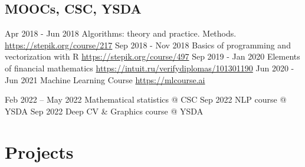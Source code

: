\documentclass[11pt,a4paper]{moderncv}
\begin{document}
\subsection{MOOCs, CSC, YSDA}
\cventry
{Apr 2018 - Jun 2018}
{Algorithms: theory and practice. Methods.}
{}
{}{\newline\url{https://stepik.org/course/217}}{}
\cventry
{Sep 2018 - Nov 2018}
{Basics of programming and vectorization with R}
{}
{}{\newline\url{https://stepik.org/course/497}}{}
\cventry
{Sep 2019 - Jan 2020}
{Elements of financial mathematics}
{}
{}{\newline\url{https://intuit.ru/verifydiplomas/101301190}}{}
\cventry
{Jun 2020 - Jun 2021}
{Machine Learning Course}
{}
{}{\newline\url{https://mlcourse.ai}}{}

\cventry
{Feb 2022 -- May 2022}
{Mathematical statistics @ CSC}
{}
{}{}{}
\cventry
{Sep 2022}
{NLP course @ YSDA}
{}
{}{}{}
\cventry
{Sep 2022}
{Deep CV \& Graphics course @ YSDA}
{}
{}{}{}









\pagebreak
\section{Projects}
\end{document}
